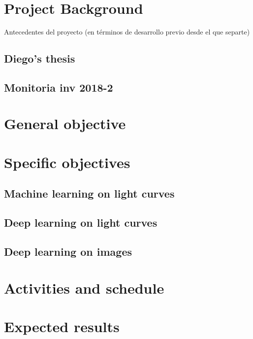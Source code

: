 \section{Project Background}
Antecedentes del proyecto (en términos de desarrollo previo desde el que separte)

\subsection{Diego's thesis}
\subsection{Monitoria inv 2018-2}
\section{General objective}
\section{Specific objectives}
\subsection{Machine learning on light curves}
\subsection{Deep learning on light curves}
\subsection{Deep learning on images}
\section{Activities and schedule}
\section{Expected results}


\newpage
\printbibliography

